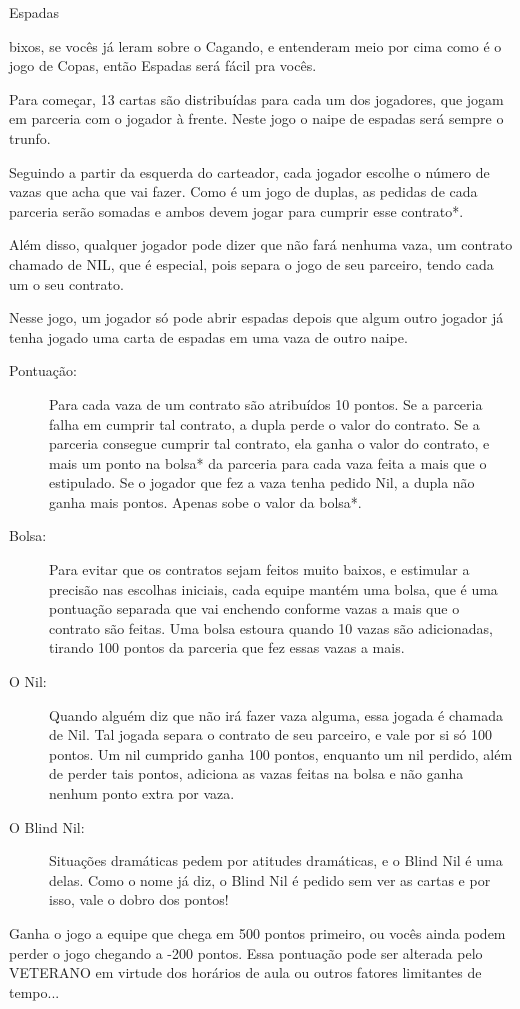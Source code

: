 \begin{subsecao}{Espadas} 

bixos, se vocês já leram sobre o Cagando, e entenderam meio por cima como é o
jogo de Copas, então Espadas será fácil pra vocês.

Para começar, 13 cartas são distribuídas para cada um dos jogadores, que jogam
em parceria com o jogador à frente. Neste jogo o naipe de espadas será sempre o
trunfo.

Seguindo a partir da esquerda do carteador, cada jogador escolhe o número de
vazas que acha que vai fazer. Como é um jogo de duplas, as pedidas de cada
parceria serão somadas e ambos devem jogar para cumprir esse contrato*. 

Além disso, qualquer jogador pode dizer que não fará nenhuma vaza, um contrato
chamado de NIL, que é especial, pois separa o jogo de seu parceiro, tendo cada
um o seu contrato.

Nesse jogo, um jogador só pode abrir espadas depois que algum outro jogador já
tenha jogado uma carta de espadas em uma vaza de outro naipe.
\begin{description}

\item[Pontuação:]

Para cada vaza de um contrato são atribuídos 10 pontos. Se a parceria falha em
cumprir tal contrato, a dupla perde o valor do contrato. Se a parceria consegue
cumprir tal contrato, ela ganha o valor do contrato, e mais um ponto
na bolsa* da parceria para cada vaza feita a mais que o estipulado.
Se o jogador que fez a vaza tenha pedido Nil, a dupla não ganha mais pontos.
Apenas sobe o valor da bolsa*.

\item[Bolsa:]

Para evitar que os contratos sejam feitos muito baixos, e estimular a precisão
nas escolhas iniciais, cada equipe mantém uma bolsa, que é uma pontuação
separada que vai enchendo conforme vazas a mais que o contrato são feitas. Uma
bolsa estoura quando 10 vazas são adicionadas, tirando 100 pontos da parceria
que fez essas vazas a mais.

\item[O Nil:]
Quando alguém diz que não irá fazer vaza alguma, essa jogada é chamada de Nil.
Tal jogada separa o contrato de seu parceiro, e vale por si só 100 pontos. Um
nil cumprido ganha 100 pontos, enquanto um nil perdido, além de perder tais
pontos, adiciona as vazas feitas na bolsa e não ganha nenhum ponto extra por
vaza.

\item[O Blind Nil:]
Situações dramáticas pedem por atitudes dramáticas, e o Blind Nil é uma delas.
Como o nome já diz, o Blind Nil é pedido sem ver as cartas e por isso, vale o
dobro dos pontos!

\end{description}
Ganha o jogo a equipe que chega em 500 pontos primeiro, ou vocês ainda podem
perder o jogo chegando a -200 pontos. Essa pontuação pode ser alterada pelo
VETERANO em virtude dos horários de aula ou outros fatores limitantes de
tempo...

\end{subsecao}
